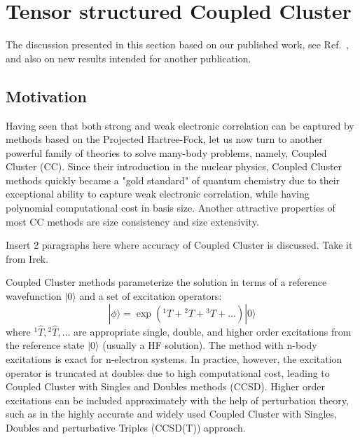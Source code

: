 \chapter{Tensor structured Coupled Cluster}
\label{ch:tcc} 
The discussion presented in this section based on our published work, see 
Ref.~\cite{schutski2017tensor}, and also on new results intended for another 
publication.

\section{Motivation}
\label{sec:Introduction} 
Having seen that both strong and weak electronic correlation can be captured 
by methods based on the Projected Hartree-Fock, let us now turn to another 
powerful family of theories to solve many-body problems, namely, Coupled 
Cluster (CC). Since their introduction in the nuclear 
physics,\cite{coester1958bound, coester1960short} Coupled Cluster methods 
quickly became a "gold standard" of quantum chemistry due to their exceptional 
ability to capture weak electronic correlation, while having polynomial 
computational cost in basis size. Another attractive properties of most CC 
methods are size consistency and size extensivity.\cite{pople1978electron, 
bartlett1978many, crawford2000introduction, bartlett2007coupled} 

{\color{red} Insert 2 paragraphs here where accuracy of Coupled Cluster is 
discussed. Take it from Irek.}

Coupled Cluster methods parameterize the solution in terms of a reference 
wavefunction $| 0 \rangle$ and a set of excitation operators:
\begin{equation}
 | \phi \rangle  = \exp({}^1\hat{T} + {}^2\hat{T} + {}^3\hat{T} + \ldots) | 0 
\rangle
\end{equation}
where ${}^1\hat{T}, {}^2\hat{T}, \ldots$ are appropriate single, double, and 
higher order excitations from the reference state $| 0 \rangle$ (usually a HF 
solution). The method with n-body excitations is exact for n-electron systems. 
In practice, however, the excitation operator is truncated at doubles due to 
high computational cost, leading to Coupled Cluster with Singles and Doubles 
methods (CCSD).\cite{purvis1982full} Higher order excitations can be included 
approximately with the help of perturbation theory, such as in the highly 
accurate and widely used Coupled Cluster with Singles, Doubles and 
perturbative Triples (CCSD(T)) approach.\cite{bartlett1990non}

